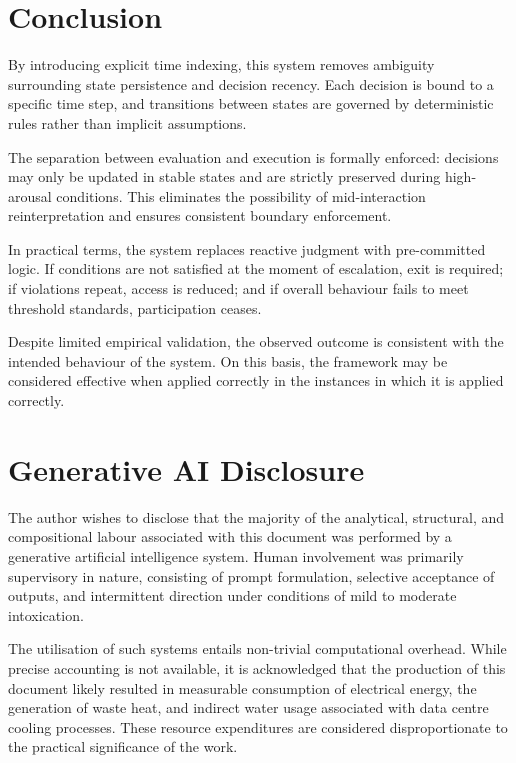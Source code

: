 \documentclass{article}
\begin{document}
	\section*{Conclusion}
	
	By introducing explicit time indexing, this system removes ambiguity surrounding state persistence and decision recency. Each decision is bound to a specific time step, and transitions between states are governed by deterministic rules rather than implicit assumptions.
	
	The separation between evaluation and execution is formally enforced: decisions may only be updated in stable states and are strictly preserved during high-arousal conditions. This eliminates the possibility of mid-interaction reinterpretation and ensures consistent boundary enforcement.
	
	In practical terms, the system replaces reactive judgment with pre-committed logic. If conditions are not satisfied at the moment of escalation, exit is required; if violations repeat, access is reduced; and if overall behaviour fails to meet threshold standards, participation ceases.
	
	Despite limited empirical validation, the observed outcome is consistent with the intended behaviour of the system. On this basis, the framework may be considered effective when applied correctly in the instances in which it is applied correctly.
	
	\section*{Generative AI Disclosure}
	
	The author wishes to disclose that the majority of the analytical, structural, and compositional labour associated with this document was performed by a generative artificial intelligence system. Human involvement was primarily supervisory in nature, consisting of prompt formulation, selective acceptance of outputs, and intermittent direction under conditions of mild to moderate intoxication.
	
	The utilisation of such systems entails non-trivial computational overhead. While precise accounting is not available, it is acknowledged that the production of this document likely resulted in measurable consumption of electrical energy, the generation of waste heat, and indirect water usage associated with data centre cooling processes. These resource expenditures are considered disproportionate to the practical significance of the work.
	
\end{document}
